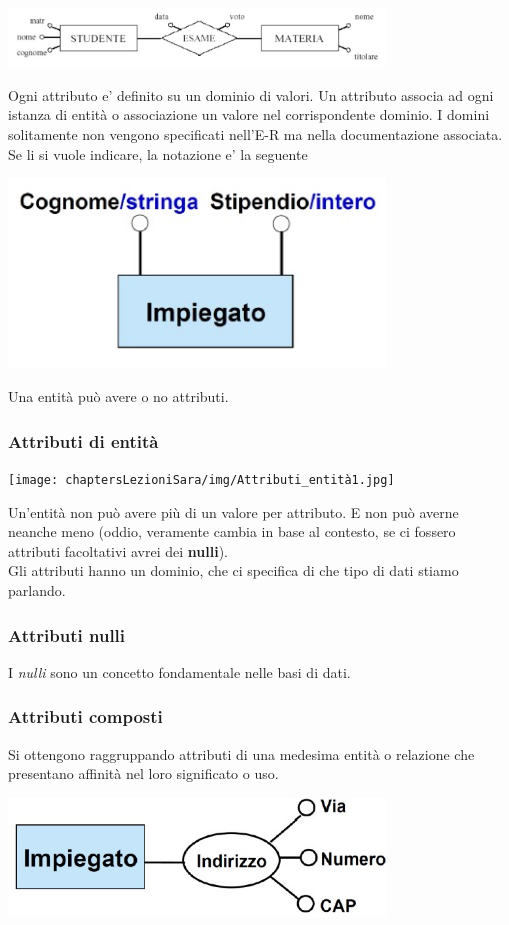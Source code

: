 \begin{center}
    \includegraphics[width=0.75\textwidth]{chaptersLezioniSara/img/Attributi2.jpg}
\end{center}
Ogni attributo e' definito su un dominio di valori.
Un attributo associa ad ogni istanza di entità o associazione
un valore nel corrispondente dominio.
I domini solitamente non vengono specificati nell'E-R ma nella
documentazione associata. Se li si vuole indicare, la
notazione e' la seguente
\begin{center}
    \includegraphics[width=0.75\textwidth]{chaptersLezioniSara/img/Attributi3.jpg}
\end{center}
Una entità può avere o no attributi.

\subsubsection{Attributi di entità}
\begin{center}
    \texttt{[image: chaptersLezioniSara/img/Attributi\_entità1.jpg]}
\end{center}
Un'entità non può avere più di un valore per attributo. E non può averne neanche meno (oddio, veramente cambia in base al contesto, se ci fossero attributi facoltativi avrei dei \textbf{nulli}).
\\Gli attributi hanno un dominio, che ci specifica di che tipo di dati stiamo parlando.
\subsubsection{Attributi nulli}
I \textit{nulli} sono un concetto fondamentale nelle basi di dati.
\subsubsection{Attributi composti}
Si ottengono raggruppando attributi di una medesima entità o relazione che presentano affinità nel loro significato o uso.
\begin{center}
    \includegraphics[width=0.75\textwidth]{chaptersLezioniSara/img/Attributi_composti.jpg}
\end{center}

